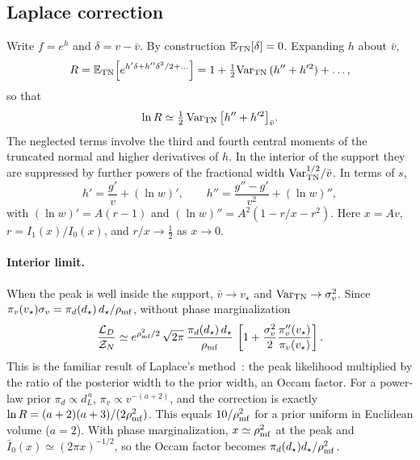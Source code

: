 \documentclass[prd,twocolumn,nofootinbib,superscriptaddress,amsmath,amssymb]{revtex4-2}
\newcommand{\rhomf}{\rho_{\rm mf}}
\newcommand{\vs}{v_\star}
\newcommand{\ds}{d_\star}
\newcommand{\Ibar}{\bar{I}}
\newcommand{\E}{\mathbb{E}}
\newcommand{\Var}{\mathrm{Var}}
\begin{document}
\subsection{Laplace correction}

Write $f = e^{h}$ and $\delta = v-\bar v$.
By construction $\E_{\rm TN}[\delta]=0$.
Expanding $h$ about $\bar v$,
\begin{equation}
R = \E_{\rm TN}\!\left[e^{h'\delta + h''\delta^2/2 + \dots}\right]
= 1 + \tfrac12\Var_{\rm TN}\,(h''+h'^2) + \dots,
\end{equation}
so that
\begin{equation}
\ln R \simeq \tfrac12\,\Var_{\rm TN}\,\big[h''+h'^2\big]_{\bar v}.
\label{eq:laplace}
\end{equation}
The neglected terms involve the third and fourth central moments of the truncated normal and higher derivatives of $h$.
In the interior of the support they are suppressed by further powers of the fractional width $\Var_{\rm TN}^{1/2}/\bar v$.
In terms of $s$,
\begin{equation}
h' = \frac{g'}{v} + (\ln w)',\qquad h'' = \frac{g''-g'}{v^2} + (\ln w)'',
\end{equation}
with $(\ln w)' = A(r-1)$ and $(\ln w)'' = A^2(1 - r/x - r^2)$.
Here $x=Av$,
$r = I_1(x)/I_0(x)$,
and $r/x\to\frac12$ as $x\to0$.

\paragraph{Interior limit.}
When the peak is well inside the support,
$\bar v\to\vs$ and $\Var_{\rm TN}\to\sigma_v^2$.
Since $\pi_v(\vs)\sigma_v = \pi_d(\ds)\,\ds/\rhomf$,
without phase marginalization
\begin{equation}
\frac{\mathcal{L}_D}{\mathcal{Z}_N} \simeq e^{\rhomf^2/2}\,\sqrt{2\pi}\,\frac{\pi_d(\ds)\,\ds}{\rhomf}\,
\left[1 + \frac{\sigma_v^2}{2}\frac{\pi_v''(\vs)}{\pi_v(\vs)}\right].
\label{eq:interior}
\end{equation}
This is the familiar result of Laplace's method~\cite{BenderOrszag1978}: the peak likelihood multiplied by the ratio of the posterior width to the prior width,
an Occam factor.
For a power-law prior $\pi_d\propto d_L^{\,a}$,
$\pi_v\propto v^{-(a+2)}$,
and the correction is exactly $\ln R = (a+2)(a+3)/(2\rhomf^2)$.
This equals $10/\rhomf^2$ for a prior uniform in Euclidean volume ($a=2$).
With phase marginalization,
$x\simeq\rhomf^2$ at the peak and $\Ibar_0(x)\simeq(2\pi x)^{-1/2}$,
so the Occam factor becomes $\pi_d(\ds)\ds/\rhomf^2$.
\end{document}
